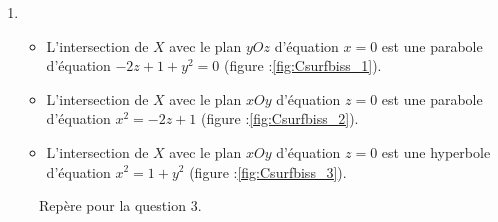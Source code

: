 \begin{enumerate}
\begin{enumerate}
\item 
\begin{itemize}
 \item L'intersection de $X$ avec le plan $yOz$ d'équation $x=0$ est une parabole d'équation $-2z+1+y^2=0$ (figure :\ref{fig:Csurfbiss_1}).
\item L'intersection de $X$ avec le plan $xOy$ d'équation $z=0$ est une parabole d'équation $x^2=-2z+1$ (figure :\ref{fig:Csurfbiss_2}).
\item L'intersection de $X$ avec le plan $xOy$ d'équation $z=0$ est une hyperbole d'équation $x^2=1+y^2$ (figure :\ref{fig:Csurfbiss_3}). 
\end{itemize}
\end{enumerate}

\begin{figure}[ht]
 \centering

\caption{Repère pour la question 3.}
\label{fig:Csurfbiss_4}
\end{figure}


\end{enumerate}
